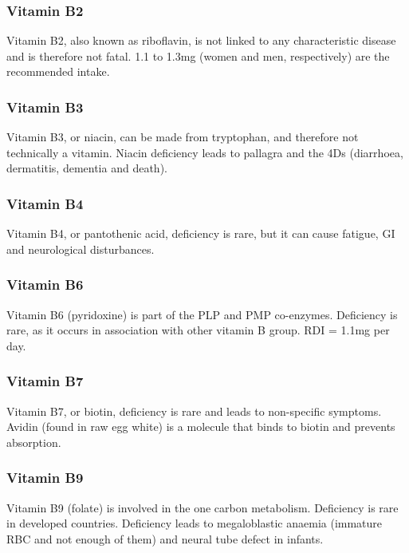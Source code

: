 \subsubsection{Vitamin B2}

Vitamin B2, also known as riboflavin, is not linked to any characteristic disease and is therefore not fatal.
1.1 to 1.3mg (women and men, respectively) are the recommended intake.

\subsubsection{Vitamin B3}

Vitamin B3, or niacin, can be made from tryptophan, and therefore not technically a vitamin.
Niacin deficiency leads to pallagra and the 4Ds (diarrhoea, dermatitis, dementia and death).

\subsubsection{Vitamin B4}

Vitamin B4, or pantothenic acid, deficiency is rare, but it can cause fatigue, GI and neurological disturbances.

\subsubsection{Vitamin B6}

Vitamin B6 (pyridoxine) is part of the PLP and PMP co-enzymes.
Deficiency is rare, as it occurs in association with other vitamin B group.
RDI = 1.1mg per day.

\subsubsection{Vitamin B7}

Vitamin B7, or biotin, deficiency is rare and leads to non-specific symptoms.
Avidin (found in raw egg white) is a molecule that binds to biotin and prevents absorption.

\subsubsection{Vitamin B9}

Vitamin B9 (folate) is involved in the one carbon metabolism.
Deficiency is rare in developed countries.
Deficiency leads to megaloblastic anaemia (immature RBC and not enough of them) and neural tube defect in infants.

